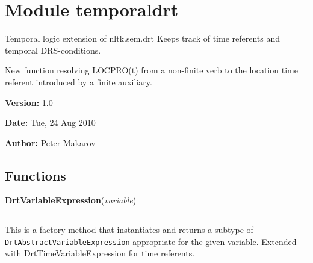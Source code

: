 %
%
%


\section{Module temporaldrt}

    \label{temporaldrt}
Temporal logic extension of nltk.sem.drt Keeps track of time referents and 
temporal DRS-conditions.

New function resolving LOCPRO(t) from a non-finite verb to the location 
time referent introduced by a finite auxiliary.

\textbf{Version:} 1.0



\textbf{Date:} Tue, 24 Aug 2010



\textbf{Author:} Peter Makarov





  \subsection{Functions}

    \label{temporaldrt:DrtVariableExpression}

    \vspace{0.5ex}

\hspace{.8\funcindent}\begin{boxedminipage}{\funcwidth}

    \raggedright \textbf{DrtVariableExpression}(\textit{variable})

    \vspace{-1.5ex}

    \rule{\textwidth}{0.5\fboxrule}
\setlength{\parskip}{2ex}
    This is a factory method that instantiates and returns a subtype of 
    \texttt{DrtAbstractVariableExpression} appropriate for the given 
    variable. Extended with DrtTimeVariableExpression for time referents.

\setlength{\parskip}{1ex}
    \end{boxedminipage}

